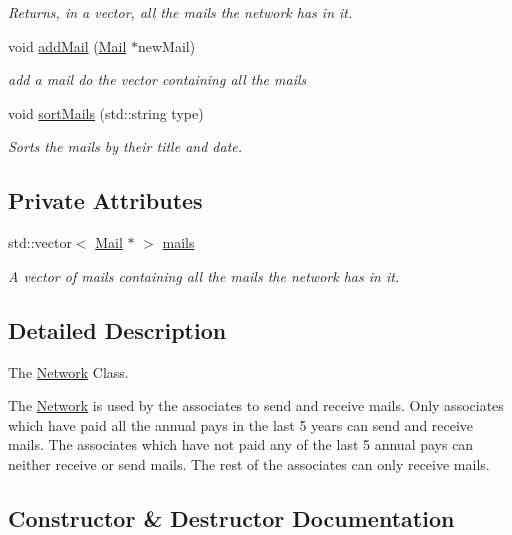 \begin{DoxyCompactItemize}
\begin{DoxyCompactList}\small\item\em Returns, in a vector, all the mails the network has in it. \end{DoxyCompactList}\item 
void \hyperlink{classNetwork_a848afdda14081f142404050833050d4b}{add\+Mail} (\hyperlink{classMail}{Mail} $\ast$new\+Mail)
\begin{DoxyCompactList}\small\item\em add a mail do the vector containing all the mails \end{DoxyCompactList}\item 
void \hyperlink{classNetwork_ab7eb46f37b172f7e7281ad5d27cb0ba0}{sort\+Mails} (std\+::string type)
\begin{DoxyCompactList}\small\item\em Sorts the mails by their title and date. \end{DoxyCompactList}\end{DoxyCompactItemize}
\subsection*{Private Attributes}
\begin{DoxyCompactItemize}
\item 
std\+::vector$<$ \hyperlink{classMail}{Mail} $\ast$ $>$ \hyperlink{classNetwork_a7d870918668129e7853c5374785955b1}{mails}
\begin{DoxyCompactList}\small\item\em A vector of mails containing all the mails the network has in it. \end{DoxyCompactList}\end{DoxyCompactItemize}


\subsection{Detailed Description}
The \hyperlink{classNetwork}{Network} Class. 

The \hyperlink{classNetwork}{Network} is used by the associates to send and receive mails. Only associates which have paid all the annual pays in the last 5 years can send and receive mails. The associates which have not paid any of the last 5 annual pays can neither receive or send mails. The rest of the associates can only receive mails. 

\subsection{Constructor \& Destructor Documentation}
\mbox{\label{classNetwork_a3cc2fb4f8fa4d507077e8da85ce5a1c8}} 
